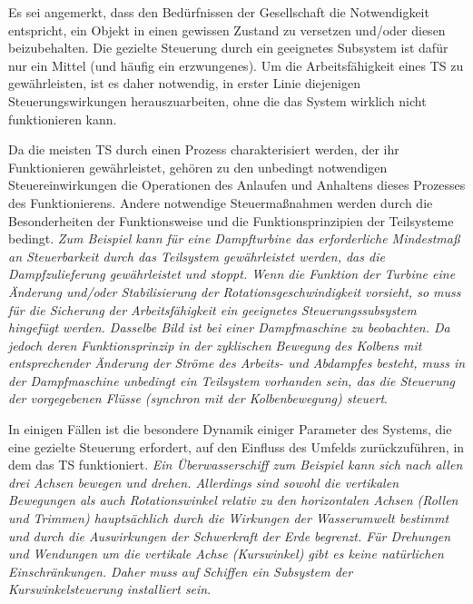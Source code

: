 \documentclass[11pt,a4paper]{article}
\begin{document}
Es sei angemerkt, dass den Bedürfnissen der Gesellschaft die Notwendigkeit
entspricht, ein Objekt in einen gewissen Zustand zu versetzen und/oder diesen
beizubehalten. Die gezielte Steuerung durch ein geeignetes Subsystem ist dafür
nur ein Mittel (und häufig ein erzwungenes). Um die Arbeitsfähigkeit eines TS
zu gewährleisten, ist es daher notwendig, in erster Linie diejenigen
Steuerungswirkungen herauszuarbeiten, ohne die das System wirklich nicht
funktionieren kann.

Da die meisten TS durch einen Prozess charakterisiert werden, der ihr
Funktionieren gewähr\-leistet, gehören zu den unbedingt notwendigen
Steuereinwirkungen die Operationen des Anlaufen und Anhaltens dieses Prozesses
des Funktionierens. Andere notwendige Steuermaßnahmen werden durch die
Besonderheiten der Funktionsweise und die Funktionsprinzipien der Teilsysteme
bedingt. \emph{Zum Beispiel kann für eine Dampfturbine das erforderliche
  Mindestmaß an Steuerbarkeit durch das Teilsystem gewährleistet werden, das
  die Dampfzulieferung gewährleistet und stoppt. Wenn die Funktion der Turbine
  eine Änderung und/oder Stabilisierung der Rotationsgeschwindigkeit vorsieht,
  so muss für die Sicherung der Arbeitsfähigkeit ein geeignetes
  Steuerungssubsystem hingefügt werden.  Dasselbe Bild ist bei einer
  Dampfmaschine zu beobachten. Da jedoch deren Funktionsprinzip in der
  zyklischen Bewegung des Kolbens mit entsprechender Änderung der Ströme des
  Arbeits- und Abdampfes besteht, muss in der Dampfmaschine unbedingt ein
  Teilsystem vorhanden sein, das die Steuerung der vorgegebenen Flüsse
  (synchron mit der Kolbenbewegung) steuert}.

In einigen Fällen ist die besondere Dynamik einiger Parameter des Systems, die
eine gezielte Steuerung erfordert, auf den Einfluss des Umfelds
zurückzuführen, in dem das TS funktioniert.  \emph{Ein Überwasserschiff zum
  Beispiel kann sich nach allen drei Achsen bewegen und drehen. Allerdings
  sind sowohl die vertikalen Bewegungen als auch Rotationswinkel relativ zu
  den horizontalen Achsen (Rollen und Trimmen) hauptsächlich durch die
  Wirkungen der Wasserumwelt bestimmt und durch die Auswirkungen der
  Schwerkraft der Erde begrenzt. Für Drehungen und Wendungen um die vertikale
  Achse (Kurswinkel) gibt es keine natürlichen Einschränkungen. Daher muss auf
  Schiffen ein Subsystem der Kurswinkelsteuerung installiert sein}.
\end{document}

